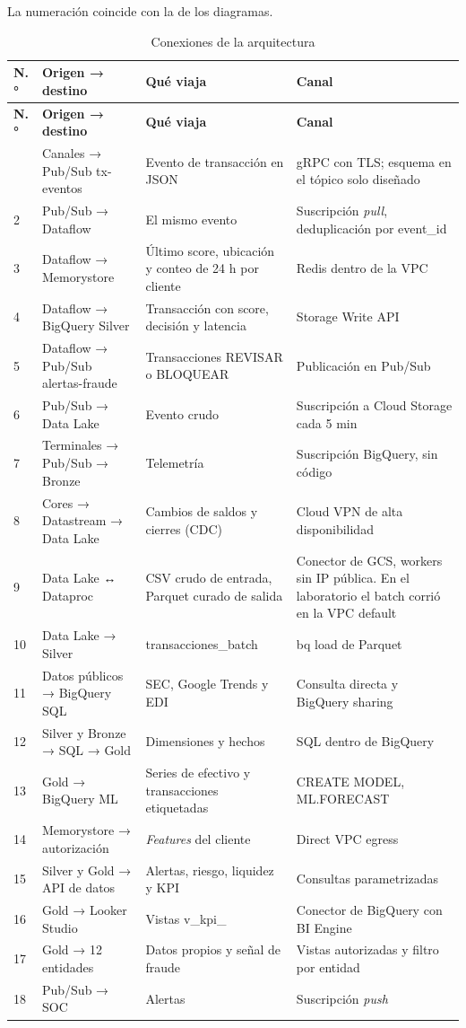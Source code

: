 \documentclass[11pt,a4paper]{article}
\DeclareRobustCommand{\cod}[1]{{\small\ttfamily\codbreaks #1}}
\DeclareRobustCommand{\codbreaks}{\let\oldus\_\renewcommand{\_}{\oldus\allowbreak}}
\begin{document}
La numeración coincide con la de los diagramas.

\begingroup\small
\begin{xltabular}{\linewidth}{@{}P{0.6cm}P{3.9cm}LP{3.6cm}@{}}
\caption{Conexiones de la arquitectura}\label{tab:conexiones}\\
\toprule
\textbf{N.°} & \textbf{Origen → destino} & \textbf{Qué viaja} & \textbf{Canal}\\
\midrule\endfirsthead
\toprule
\textbf{N.°} & \textbf{Origen → destino} & \textbf{Qué viaja} & \textbf{Canal}\\
\midrule\endhead
\bottomrule{} & Canales → Pub/Sub \cod{tx-eventos} & Evento de transacción en JSON & gRPC con TLS; esquema en el tópico solo diseñado\\
2 & Pub/Sub → Dataflow & El mismo evento & Suscripción \textit{pull}, deduplicación por \cod{event\_id}\\
3 & Dataflow → Memorystore & Último score, ubicación y conteo de 24 h por cliente & Redis dentro de la VPC\\
4 & Dataflow → BigQuery Silver & Transacción con score, decisión y latencia & Storage Write API\\
5 & Dataflow → Pub/Sub \cod{alertas-fraude} & Transacciones REVISAR o BLOQUEAR & Publicación en Pub/Sub\\
6 & Pub/Sub → Data Lake & Evento crudo & Suscripción a Cloud Storage cada 5 min\\
7 & Terminales → Pub/Sub → Bronze & Telemetría & Suscripción BigQuery, sin código\\
8 & Cores → Datastream → Data Lake & Cambios de saldos y cierres (CDC) & Cloud VPN de alta disponibilidad\\
9 & Data Lake ↔ Dataproc & CSV crudo de entrada, Parquet curado de salida & Conector de GCS, workers sin IP pública. En el laboratorio el batch corrió en la VPC \cod{default}\\
10 & Data Lake → Silver & \cod{transacciones\_batch} & \cod{bq load} de Parquet\\
11 & Datos públicos → BigQuery SQL & SEC, Google Trends y EDI & Consulta directa y BigQuery sharing\\
12 & Silver y Bronze → SQL → Gold & Dimensiones y hechos & SQL dentro de BigQuery\\
13 & Gold → BigQuery ML & Series de efectivo y transacciones etiquetadas & \cod{CREATE MODEL}, \cod{ML.FORECAST}\\
14 & Memorystore → autorización & \textit{Features} del cliente & Direct VPC egress\\
15 & Silver y Gold → API de datos & Alertas, riesgo, liquidez y KPI & Consultas parametrizadas\\
16 & Gold → Looker Studio & Vistas \cod{v\_kpi\_*} & Conector de BigQuery con BI Engine\\
17 & Gold → 12 entidades & Datos propios y señal de fraude & Vistas autorizadas y filtro por entidad\\
18 & Pub/Sub → SOC & Alertas & Suscripción \textit{push}\\
\end{xltabular}
\endgroup
\end{document}
